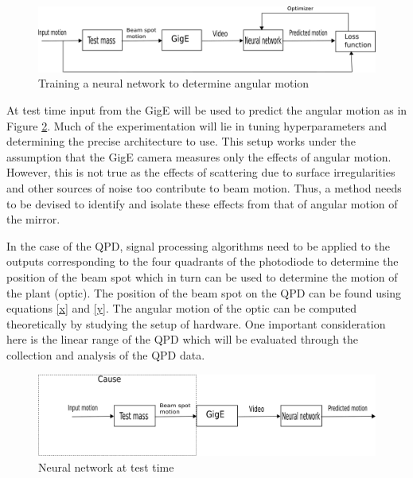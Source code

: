 \documentclass[colorlinks=true,pdfstartview=FitV,linkcolor=blue,
            citecolor=red,urlcolor=magenta]{ligodoc}
\begin{document}
    \begin{figure}[htbp]
    \begin{center}
    \includegraphics[width =.7\linewidth]{figures/train.pdf}
    \caption{Training a neural network to determine angular motion}
    \label{fig:train}
    \end{center}
    \end{figure}
    
    At test time input from the GigE will be used to predict the angular motion as in Figure \ref{fig:test}. Much of the experimentation will lie in tuning hyperparameters and determining the precise architecture to use. This setup works under the assumption that the GigE camera measures only the effects of angular motion. However, this is not true as the effects of scattering due to surface irregularities and other sources of noise too contribute to beam motion. Thus, a method needs to be devised to identify and isolate these effects from that of angular motion of the mirror. 

     In the case of the QPD, signal processing algorithms need to be applied to the outputs corresponding to the four quadrants of the photodiode to determine the position of the beam spot which in turn can be used to determine the motion of the plant (optic). The position of the beam spot on the QPD can be found using equations \ref{x} and \ref{y}. The angular motion of the optic can be computed theoretically by studying the setup of hardware. One important consideration here is the linear range of the QPD which will be evaluated through the collection and analysis of the QPD data. 

    \begin{figure}[htbp]
    \begin{center}
    \includegraphics[width =.7\linewidth]{figures/test.pdf}
    \caption{Neural network at test time}
    \label{fig:test}
    \end{center}
    \end{figure}  
\end{document}
